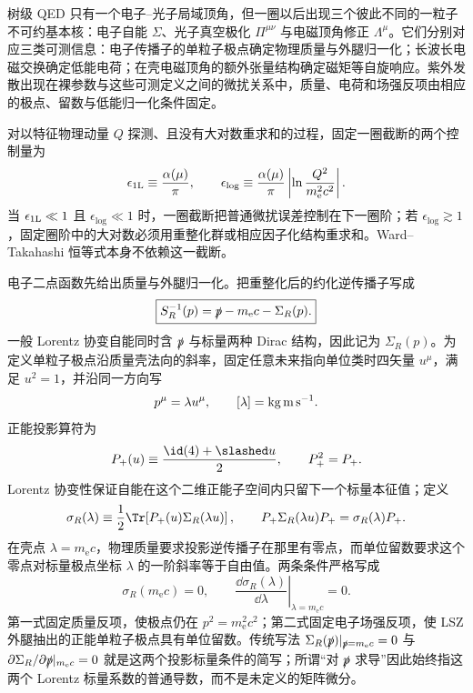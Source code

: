 
树级 QED 只有一个电子--光子局域顶角，但一圈以后出现三个彼此不同的一粒子不可约基本核：电子自能 \(\Sigma\)、光子真空极化 \(\Pi^{\mu\nu}\) 与电磁顶角修正 \(\Lambda^\mu\)。它们分别对应三类可测信息：电子传播子的单粒子极点确定物理质量与外腿归一化；长波长电磁交换确定低能电荷；在壳电磁顶角的额外张量结构确定磁矩等自旋响应。紫外发散出现在裸参数与这些可测定义之间的微扰关系中，质量、电荷和场强反项由相应的极点、留数与低能归一化条件固定。

对以特征物理动量 \(Q\) 探测、且没有大对数重求和的过程，固定一圈截断的两个控制量为
\begin{equation*}
\epsilon_{\rm 1L}\equiv\frac{\alpha(\mu)}{\pi},
\qquad
\epsilon_{\log}\equiv
\frac{\alpha(\mu)}{\pi}
\left|\ln\frac{Q^2}{m_{\mathrm e}^2c^2}\right|.
\end{equation*}
当 \(\epsilon_{\rm 1L}\ll1\) 且 \(\epsilon_{\log}\ll1\) 时，一圈截断把普通微扰误差控制在下一圈阶；若 \(\epsilon_{\log}\gtrsim1\)，固定圈阶中的大对数必须用重整化群或相应因子化结构重求和。Ward--Takahashi 恒等式本身不依赖这一截断。

电子二点函数先给出质量与外腿归一化。把重整化后的约化逆传播子写成
\begin{equation}
\boxed{
S_R^{-1}(p)
=\slashed p-m_{\mathrm e} c-\Sigma_R(p).}
\label{eq:qed-renormalized-electron-inverse-dp53}
\end{equation}
一般 Lorentz 协变自能同时含 $\slashed p$ 与标量两种 Dirac 结构，因此记为 $\Sigma_R(p)$。为定义单粒子极点沿质量壳法向的斜率，固定任意未来指向单位类时四矢量 $u^\mu$，满足 $u^2=1$，并沿同一方向写
\begin{equation*}
 p^\mu=\lambda u^\mu,
 \qquad [\lambda]={\rm kg\,m\,s^{-1}}.
\end{equation*}
正能投影算符为
\begin{equation*}
 P_+(u)\equiv\frac{\id(4)+\slashed u}{2},
 \qquad P_+^2=P_+.
\end{equation*}
Lorentz 协变性保证自能在这个二维正能子空间内只留下一个标量本征值；定义
\begin{equation*}
 \sigma_R(\lambda)
 \equiv\frac12\Tr\!\left[P_+(u)\Sigma_R(\lambda u)\right],
 \qquad
 P_+\Sigma_R(\lambda u)P_+=\sigma_R(\lambda)P_+.
\end{equation*}
在壳点 $\lambda=m_{\mathrm e} c$，物理质量要求投影逆传播子在那里有零点，而单位留数要求这个零点对标量极点坐标 $\lambda$ 的一阶斜率等于自由值。两条条件严格写成
\begin{equation}
\boxed{
\sigma_R(m_{\mathrm e} c)=0,
\qquad
\left.\frac{\dd\sigma_R(\lambda)}{\dd\lambda}\right|_{\lambda=m_{\mathrm e} c}=0.}
\label{eq:qed-onshell-selfenergy-conditions-dp53}
\end{equation}
第一式固定质量反项，使极点仍在 $p^2=m_{\mathrm e}^2c^2$；第二式固定电子场强反项，使 LSZ 外腿抽出的正能单粒子极点具有单位留数。传统写法
$\Sigma_R(\slashed p)|_{\slashed p=m_{\mathrm e} c}=0$ 与
$\partial\Sigma_R/\partial\slashed p|_{m_{\mathrm e} c}=0$
就是这两个投影标量条件的简写；所谓“对 $\slashed p$ 求导”因此始终指这两个 Lorentz 标量系数的普通导数，而不是未定义的矩阵微分。

